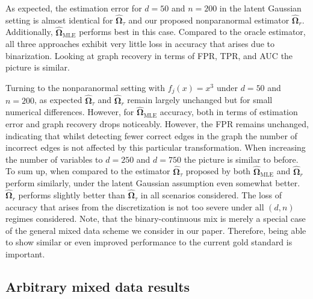 As expected, the estimation error for $d = 50$ and $n=200$ in the latent Gaussian setting is almost identical for $\hat{\boldsymbol\Omega}_\tau$ and our proposed nonparanormal estimator $\hat{\boldsymbol\Omega}_r$. Additionally, $\hat{\boldsymbol\Omega}_{\text{MLE}}$ performs best in this case. Compared to the oracle estimator, all three approaches exhibit very little loss in accuracy that arises due to binarization. Looking at graph recovery in terms of FPR, TPR, and AUC the picture is similar.

Turning to the nonparanormal setting with $f_j(x) = x^3$ under $d = 50$ and $n=200$, as expected $\hat{\boldsymbol\Omega}_\tau$ and $\hat{\boldsymbol\Omega}_r$ remain largely unchanged but for small numerical differences. However, for $\hat{\boldsymbol\Omega}_{\text{MLE}}$ accuracy, both in terms of estimation error and graph recovery drops noticeably. However, the FPR remains unchanged, indicating that whilst detecting fewer correct edges in the graph the number of incorrect edges is not affected by this particular transformation. When increasing the number of variables to $d=250$ and $d=750$ the picture is similar to before. To sum up, when compared to the estimator $\hat{\boldsymbol\Omega}_\tau$ proposed by \citet{Fan17} both $\hat{\boldsymbol\Omega}_{\text{MLE}}$ and $\hat{\boldsymbol\Omega}_r$ perform similarly, under the latent Gaussian assumption even somewhat better. $\hat{\boldsymbol\Omega}_r$ performs slightly better than $\hat{\boldsymbol\Omega}_\tau$ in all scenarios considered. The loss of accuracy that arises from the discretization is not too severe under all $(d,n)$ regimes considered. Note, that the binary-continuous mix is merely a special case of the general mixed data scheme we consider in our paper. Therefore, being able to show similar or even improved performance to the current gold standard is important.

\subsection{Arbitrary mixed data results}

